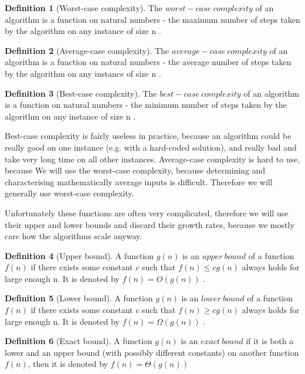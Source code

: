 \documentclass{report}
\theoremstyle{plain}
\theoremstyle{definition}
\newtheorem{definition}{Definition}
\theoremstyle{remark}
\numberwithin{definition}{chapter}
\numberwithin{example}{chapter}
\numberwithin{figure}{chapter}
\begin{document}
\begin{definition}[Worst-case complexity]
The $worst-case \ complexity$ of an algorithm is a function on natural numbers - the maximum number of steps taken by the algorithm on any instance of size n \cite{skiena504algorithm}.
\end{definition}

\begin{definition}[Average-case complexity]
The $average-case \ complexity$ of an algorithm is a function on natural numbers - the average number of steps taken by the algorithm on any instance of size n \cite{skiena504algorithm}.
\end{definition}

\begin{definition}[Best-case complexity]
The $best-case \ complexity$ of an algorithm is a function on natural numbers - the minimum number of steps taken by the algorithm on any instance of size n \cite{skiena504algorithm}.
\end{definition}

Best-case complexity is fairly useless in practice, because an algorithm could be really good on one instance (e.g. with a hard-coded solution), and really bad and take very long time on all other instances. Average-case complexity is hard to use, because 
We will use the worst-case complexity, because determining and characterising mathematically average inputs is difficult. Therefore we will generally use worst-case complexity.

Unfortunately these functions are often very complicated, therefore we will use their upper and lower bounds and discard their growth rates, because we mostly care how the algorithms scale anyway.

\begin{definition}[Upper bound]
A function $g(n)$ is an $upper \ bound$ of a function $f(n)$ if there exists some constant $c$ such that $f(n)\leq cg(n)$ always holds for large enough n. It is denoted by $f(n) = O(g(n))$ \cite{skiena504algorithm}.
\end{definition}

\begin{definition}[Lower bound]
A function $g(n)$ is an $lower \ bound$ of a function $f(n)$ if there exists some constant $c$ such that $f(n)\geq cg(n)$ always holds for large enough n. It is denoted by $f(n) = \Omega(g(n))$ \cite{skiena504algorithm}.
\end{definition}

\begin{definition}[Exact bound]
A function $g(n)$ is an $exact \ bound$ if it is both a lower and an upper bound (with possibly different constants) on another function $f(n)$, then it is denoted by $f(n) = \Theta(g(n))$
\end{definition}
\end{document}
